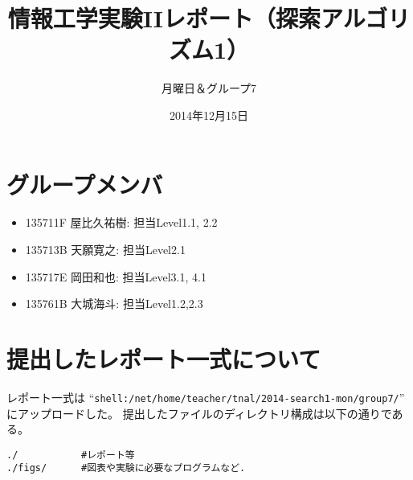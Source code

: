 \documentclass[10pt]{jarticle}
\begin{document}
\title{情報工学実験IIレポート（探索アルゴリズム1）}
\author{月曜日＆グループ7} %
\date{2014年12月15日}

\maketitle

% 

\section*{グループメンバ}
\begin{itemize}
 \item 135711F 屋比久祐樹: 担当Level1.1, 2.2
 \item 135713B 天願寛之: 担当Level2.1
 \item 135717E 岡田和也: 担当Level3.1, 4.1
 \item 135761B 大城海斗: 担当Level1.2,2.3
\end{itemize}

\section*{提出したレポート一式について}
レポート一式は
``\verb|shell:/net/home/teacher/tnal/2014-search1-mon/group7/|''
にアップロードした。
提出したファイルのディレクトリ構成は以下の通りである。

\vspace{+0.5cm}
\begin{breakbox}
\begin{verbatim}
./           #レポート等
./figs/      #図表や実験に必要なプログラムなど.

\end{verbatim}
\end{breakbox}
\end{document}

